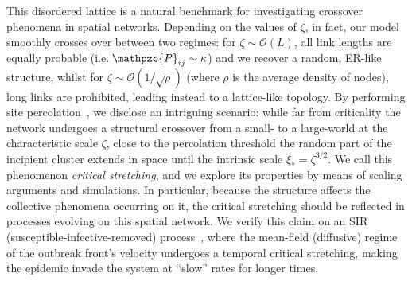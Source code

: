 \documentclass[aps, groupedaddress, superscriptaddress, prl, reprint]{revtex4-1}
\begin{document}
\indent 
This disordered lattice is a natural benchmark for investigating crossover phenomena in spatial networks.
Depending on the values of $\zeta$, in fact, our model smoothly crosses over between two regimes: for $\zeta\sim\mathcal{O}(L)$, all link lengths are equally probable (i.e.\,$\mathpzc{P}_{ij}\sim \kappa$) and we recover a random, ER-like structure, whilst for $\zeta\sim\mathcal{O}(1/\sqrt{\rho})$ (where $\rho$ is the average density of nodes), long links are prohibited, leading instead to a lattice-like topology. 
By performing site percolation~\cite{Con982,Stauf14,BuH012}, we disclose an intriguing scenario: while far from criticality the network undergoes a structural crossover from a small- to a large-world at the characteristic scale $\zeta$, close to the percolation threshold the random part of the incipient cluster extends in space until the intrinsic scale $\xi_*=\zeta^{3/2}$. 
We call this phenomenon {\em critical stretching}, and we explore its properties by means of scaling arguments and simulations.
In particular, because the structure affects the collective phenomena occurring on it, the critical stretching should be reflected in processes evolving on this spatial network. 
We verify this claim on an SIR (susceptible-infective-removed) process~\cite{epidemics}, where the mean-field (diffusive) regime of the outbreak front's velocity undergoes a temporal critical stretching, making the epidemic invade the system at ``slow'' rates for longer times.\vspace{-0.1cm}
\end{document}
